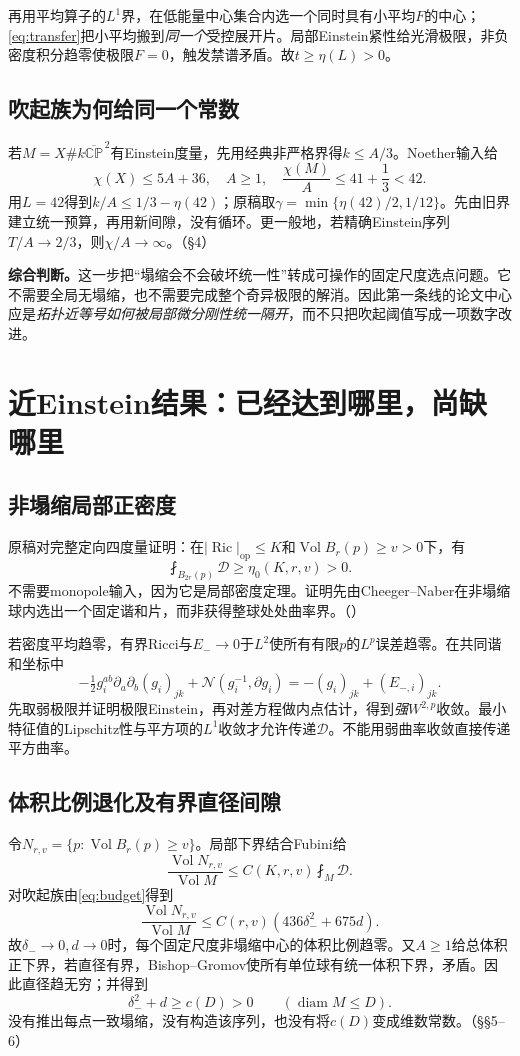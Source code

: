 \documentclass[UTF8,fontset=fandol,zihao=-4]{ctexart}
\theoremstyle{research}
\DeclareMathOperator{\Ric}{Ric}
\DeclareMathOperator{\Vol}{Vol}
\DeclareMathOperator{\diam}{diam}
\newcommand{\CP}{\mathbb{CP}}
\newcommand{\op}{\mathrm{op}}
\newcommand{\Dcal}{\mathcal D}
\numberwithin{equation}{section}
\begin{document}
再用平均算子的$L^1$界，在低能量中心集合内选一个同时具有小平均$F$的中心；\eqref{eq:transfer}把小平均搬到\emph{同一个}受控展开片。局部Einstein紧性给光滑极限，非负密度积分趋零使极限$F=0$，触发禁谱矛盾。故$t\ge\eta(L)>0$。

\subsection{吹起族为何给同一个常数}
若$M=X\#k\overline{\CP}^{\,2}$有Einstein度量，先用经典非严格界得$k\le A/3$。Noether输入给
\[
\chi(X)\le5A+36,\quad A\ge1,\quad
\frac{\chi(M)}A\le41+\frac13<42.
\]
用$L=42$得到$k/A\le1/3-\eta(42)$；原稿取$\gamma=\min\{\eta(42)/2,1/12\}$。先由旧界建立统一预算，再用新间隙，没有循环。更一般地，若精确Einstein序列$T/A\to2/3$，则$\chi/A\to\infty$。\cite{U}（§4）

\textbf{综合判断。}这一步把“塌缩会不会破坏统一性”转成可操作的固定尺度选点问题。它不需要全局无塌缩，也不需要完成整个奇异极限的解消。因此第一条线的论文中心应是\emph{拓扑近等号如何被局部微分刚性统一隔开}，而不只把吹起阈值写成一项数字改进。

\section{近Einstein结果：已经达到哪里，尚缺哪里}
\subsection{非塌缩局部正密度}
原稿对完整定向四度量证明：在$|\Ric|_{\op}\le K$和$\Vol B_r(p)\ge v>0$下，有
\[
\fint_{B_{2r}(p)}\Dcal\ge\eta_0(K,r,v)>0.
\]
不需要monopole输入，因为它是局部密度定理。证明先由Cheeger--Naber在非塌缩球内选出一个固定谐和片，而非获得整球处处曲率界。\cite{U}（）\cite{CN}

若密度平均趋零，有界Ricci与$E_-\to0$于$L^2$使所有有限$p$的$L^p$误差趋零。在共同谐和坐标中
\[
-\tfrac12g_i^{ab}\partial_a\partial_b(g_i)_{jk}+\mathcal N(g_i^{-1},\partial g_i)
=-(g_i)_{jk}+(E_{-,i})_{jk}.
\]
先取弱极限并证明极限Einstein，再对差方程做内点估计，得到\emph{强}$W^{2,p}$收敛。最小特征值的Lipschitz性与平方项的$L^1$收敛才允许传递$\Dcal$。不能用弱曲率收敛直接传递平方曲率。

\subsection{体积比例退化及有界直径间隙}
令$N_{r,v}=\{p:\Vol B_r(p)\ge v\}$。局部下界结合Fubini给
\[
\frac{\Vol N_{r,v}}{\Vol M}\le C(K,r,v)\fint_M\Dcal.
\]
对吹起族由\eqref{eq:budget}得到
\[
\frac{\Vol N_{r,v}}{\Vol M}\le C(r,v)(436\delta_-^2+675d).
\]
故$\delta_-\to0,d\to0$时，每个固定尺度非塌缩中心的体积比例趋零。又$A\ge1$给总体积正下界，若直径有界，Bishop--Gromov使所有单位球有统一体积下界，矛盾。因此直径趋无穷；并得到
\[
\delta_-^2+d\ge c(D)>0\qquad(\diam M\le D).
\]
没有推出每点一致塌缩，没有构造该序列，也没有将$c(D)$变成维数常数。\cite{U}（§§5--6）
\end{document}

